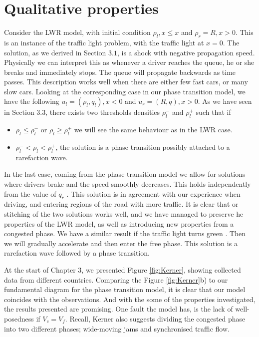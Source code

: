 \documentclass[10pt]{article}
\numberwithin{equation}{section}
\begin{document}
\section{Qualitative properties}
Consider the LWR model, with initial condition $\rho_l, x \leq x$ and $\rho_r = R, x > 0$. This is an instance of the traffic light problem, with the traffic light at $x = 0$. The solution, as we derived in Section $3.1$, is a shock with negative propagation speed. Physically we can interpret this as whenever a driver reaches the queue, he or she breaks and immediately stops. The queue will propagate backwards as time passes. This description works well when there are either few fast cars, or many slow cars. Looking at the corresponding case in our phase transition model, we have the following $u_l = (\rho_l, q_l), x < 0$ and $u_r = (R, q), x > 0$. As we have seen in Section $3.3$, there exists two thresholds densities $\rho_l^-$ and $\rho_l^+$ such that if
\begin{itemize}
    \item $\rho_l \leq \rho_l^-$ or $\rho_l \geq \rho_l^+$ we will see the same behaviour as in the LWR case. 
    \item $\rho_l^- < \rho_l < \rho_l^+$, the solution is a phase transition possibly attached to a rarefaction wave.
\end{itemize}
In the last case, coming from the phase transition model we allow for solutions where drivers brake and the speed smoothly decreases. This holds independently from the value of $q_r$ \cite{Colombo2003}. This solution is in agreement with our experience when driving, and entering regions of the road with more traffic. It is clear that or stitching of the two solutions works well, and we have managed to preserve he properties of the LWR model, as well as introducing new properties from a congested phase. We have a similar result if the traffic light turns green \cite{Colombo2003}. Then we will gradually accelerate and then enter the free phase. This solution is a rarefaction wave followed by a phase transition. 

At the start of Chapter $3$, we presented Figure \ref{fig:Kerner}, showing collected data from different countries. Comparing the Figure \ref{fig:Kerner}b) to our fundamental diagram for the phase transition model, it is clear that our model coincides with the observations. And with the some of the properties investigated, the results presented are promising. One fault the model has, is the lack of well-posedness if $V_c = V_f$. Recall, Kerner also suggests dividing the congested phase into two different phases; wide-moving jams and synchronised traffic flow. 
\end{document}
